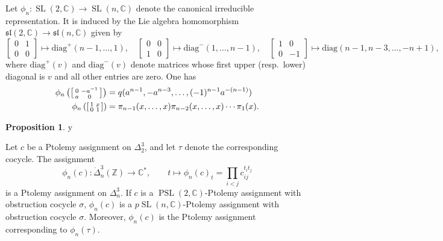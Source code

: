\documentclass[11pt]{amsart}
\theoremstyle{definition}
\newtheorem{proposition}[theorem]{Proposition}
\numberwithin{equation}{section}
\def\printname#1{
        \if\draft y
                \smash{\makebox[0pt]{\hspace{-0.5in}
                        \raisebox{8pt}{\tt\tiny #1}}}
        \fi
}
\def\lbl#1{\label{#1}\printname{#1}}
\DeclareMathOperator{\SL}{SL}
\DeclareMathOperator{\PSL}{PSL}
\DeclareMathOperator{\diag}{diag}
\newcommand{\C}{\mathbb C}
\newcommand{\Z}{\mathbb Z}
\def\a{\alpha}
\def\diag{\mathrm{diag}}
\begin{document}
Let $\phi_n\colon\SL(2,\C)\to\SL(n,\C)$ denote the canonical irreducible 
representation. It is induced by the Lie algebra homomorphism 
$\mathfrak{sl}(2,\C)\to\mathfrak{sl}(n,\C)$ given by
\begin{equation}
\left[\begin{smallmatrix}0&1\\0&0\end{smallmatrix}\right]
\mapsto\diag^+(n-1,\dots,1),\quad 
\left[\begin{smallmatrix}0&0\\1&0\end{smallmatrix}\right]
\mapsto\diag^-(1,\dots,n-1),\quad \left[\begin{smallmatrix}1&0\\0&-1
\end{smallmatrix}\right]\mapsto\diag(n-1,n-3,\dots,-n+1),
\end{equation}
where $\diag^+(v)$ and $\diag^-(v)$ denote matrices whose first upper 
(resp.~lower) diagonal is $v$ and all other entries are zero. One has
\begin{align}
\phi_n\left(\left[\begin{smallmatrix}0&-a^{-1}\\a&0\end{smallmatrix}
\right]\right)&=q(a^{n-1},-a^{n-3},\dots,(-1)^{n-1}a^{-(n-1)})\lbl{phinlong}\\
\phi_n\left(\left[\begin{smallmatrix}1&x\\0&1\end{smallmatrix}\right]\right)&
=\pi_{n-1}(x,\dots ,x)\pi_{n-2}(x,\dots,x)\cdots\pi_1(x)\lbl{phinshort}.
\end{align}

\begin{proposition}
\lbl{adjointPtolemy} 
Let $c$ be a Ptolemy assignment on $\Delta_2^3$, and let $\tau$ denote the 
corresponding cocycle. The assignment 
\begin{equation}
\phi_n(c)\colon\dot\Delta^3_n(\Z)\to \C^*,\qquad t\mapsto\phi_n(c)_t
=\prod_{i<j}c_{ij}^{t_it_j}
\end{equation}
is a Ptolemy assignment on $\Delta_n^3$. If $c$ is a $\PSL(2,\C)$-Ptolemy 
assignment with obstruction cocycle $\sigma$, $\phi_n(c)$ is a 
$p\SL(n,\C)$-Ptolemy assignment with obstruction cocycle $\sigma$. Moreover, 
$\phi_n(c)$ is the Ptolemy assignment corresponding to $\phi_n(\tau)$.
\end{proposition}
\end{document}
